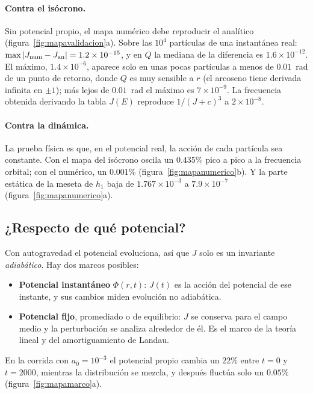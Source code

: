 \documentclass[11pt,a4paper]{article}
\newcommand{\Jr}{J}
\newcommand{\Qr}{Q}
\theoremstyle{definition}
\begin{document}
\paragraph{Contra el isócrono.} Sin potencial propio, el mapa numérico debe
reproducir el analítico (figura~\ref{fig:mapavalidacion}a). Sobre las $10^4$ partículas de una instantánea real:
$\max|\Jr_{\rm num}-\Jr_{\rm an}|=1.2\times10^{-15}$, y en $\Qr$ la mediana de la
diferencia es $1.6\times10^{-12}$. El máximo, $1.4\times10^{-6}$, aparece solo en unas
pocas partículas a menos de $0.01$~rad de un punto de retorno, donde $\Qr$ es muy
sensible a $r$ (el arcoseno tiene derivada infinita en $\pm1$); más lejos de $0.01$~rad
el máximo es $7\times10^{-9}$. La frecuencia obtenida
derivando la tabla $\Jr(E)$ reproduce $1/(\Jr+c)^3$ a $2\times10^{-8}$.

\paragraph{Contra la dinámica.} La prueba física es que, en el potencial real, la
acción de cada partícula sea constante. Con el mapa del isócrono oscila un $0.435\%$
pico a pico a la frecuencia orbital; con el numérico, un $0.001\%$
(figura~\ref{fig:mapanumerico}b). Y la parte estática de la meseta de $h_1$ baja de
$1.767\times10^{-3}$ a $7.9\times10^{-7}$ (figura~\ref{fig:mapanumerico}a).

\subsection{¿Respecto de qué potencial?}

Con autogravedad el potencial evoluciona, así que $\Jr$ solo es un invariante
\emph{adiabático}. Hay dos marcos posibles:

\begin{itemize}
  \item \textbf{Potencial instantáneo} $\Phi(r,t)$: $\Jr(t)$ es la acción del
    potencial de ese instante, y sus cambios miden evolución no adiabática.
  \item \textbf{Potencial fijo}, promediado o de equilibrio: $\Jr$ se conserva para
    el campo medio y la perturbación se analiza alrededor de él. Es el marco de la
    teoría lineal y del amortiguamiento de Landau.
\end{itemize}

En la corrida con $a_0=10^{-3}$ el potencial propio cambia un $22\%$ entre $t=0$ y
$t=2000$, mientras la distribución se mezcla, y después fluctúa solo un $0.05\%$
(figura~\ref{fig:mapamarco}a).
\end{document}
